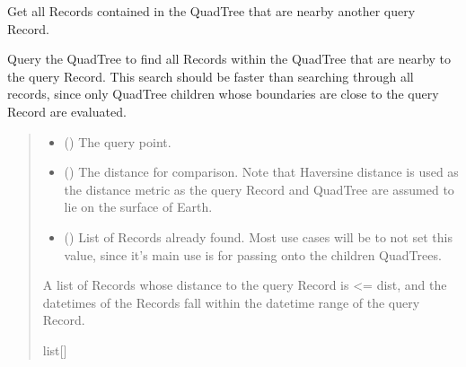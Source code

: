\documentclass[letterpaper,10pt,english]{sphinxmanual}
\begin{document}
\begin{fulllineitems}
\begin{fulllineitems}
\label{\detokenize{quadtree:GeoSpatialTools.quadtree.QuadTree.nearby_points}}
\pysigstartsignatures
\pysiglinewithargsret
{}
{\sphinxparamcomma {}\sphinxparamcomma {}}
{}
\pysigstopsignatures
\sphinxAtStartPar
Get all Records contained in the QuadTree that are nearby
another query Record.

\sphinxAtStartPar
Query the QuadTree to find all Records within the QuadTree that
are nearby to the query Record. This search should be faster
than searching through all records, since only QuadTree children whose
boundaries are close to the query Record are evaluated.
\begin{quote}\begin{description}
\begin{itemize}
\item {}
\sphinxAtStartPar
{} ({\hyperref[\detokenize{record:GeoSpatialTools.record.Record}]{}}) \textendash{} The query point.

\item {}
\sphinxAtStartPar
{} () \textendash{} The distance for comparison. Note that Haversine distance is used
as the distance metric as the query Record and QuadTree are
assumed to lie on the surface of Earth.

\item {}
\sphinxAtStartPar
{} (\sphinxstyleliteralemphasis{\sphinxupquote{ | }}) \textendash{} List of Records already found. Most use cases will be to
not set this value, since it’s main use is for passing onto the
children QuadTrees.

\end{itemize}

\sphinxAtStartPar
A list of Records whose distance to the
query Record is \textless{}= dist, and the datetimes of the
Records fall within the datetime range of the query
Record.

\sphinxAtStartPar
list{[}{\hyperref[\detokenize{record:GeoSpatialTools.record.Record}]{}}{]}


\end{description}
\end{quote}
\end{fulllineitems}
\end{fulllineitems}
\end{document}
